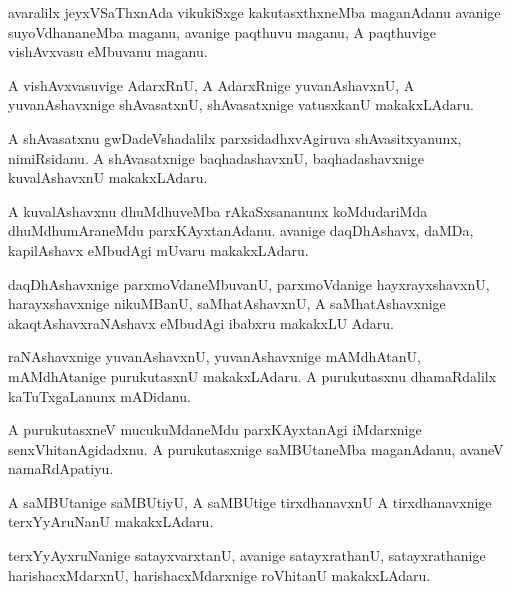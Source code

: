 \documentclass{article}
\begin{document}
\begin{mn}
avaralilx jeyxVSaThxnAda vikukiSxge kakutasxthxneMba maganAdanu
avanige suyoVdhananeMba maganu, avanige paqthuvu maganu, A paqthuvige
vishAvxvasu eMbuvanu maganu.
\end{mn}

\begin{mn}
A vishAvxvasuvige AdarxRnU, A AdarxRnige yuvanAshavxnU, A
yuvanAshavxnige shAvasatxnU, shAvasatxnige vatusxkanU makakxLAdaru.
\end{mn}

\begin{mn}%
A shAvasatxnu gwDadeVshadalilx parxsidadhxvAgiruva shAvasitxyanunx,
nimiRsidanu. A shAvasatxnige baqhadashavxnU, baqhadashavxnige
kuvalAshavxnU makakxLAdaru.
\end{mn}

\begin{mn}
A kuvalAshavxnu dhuMdhuveMba rAkaSxsananunx koMdudariMda
dhuMdhumAraneMdu parxKAyxtanAdanu. avanige daqDhAshavx, daMDa,
kapilAshavx eMbudAgi mUvaru makakxLAdaru.
\end{mn}

\begin{mn}%
daqDhAshavxnige parxmoVdaneMbuvanU, parxmoVdanige hayxrayxshavxnU,
harayxshavxnige nikuMBanU, saMhatAshavxnU, A saMhatAshavxnige
akaqtAshavxraNAshavx eMbudAgi ibabxru makakxLU Adaru.
\end{mn}

\begin{mn}%
raNAshavxnige yuvanAshavxnU, yuvanAshavxnige mAMdhAtanU, mAMdhAtanige
purukutasxnU makakxLAdaru. A purukutasxnu dhamaRdalilx kaTuTxgaLanunx mADidanu.
\end{mn}

\begin{mn}%
A purukutasxneV mucukuMdaneMdu parxKAyxtanAgi iMdarxnige
senxVhitanAgidadxnu. A purukutasxnige saMBUtaneMba maganAdanu, avaneV namaRdApatiyu.
\end{mn}

\begin{mn}
A saMBUtanige saMBUtiyU, A saMBUtige tirxdhanavxnU A tirxdhanavxnige
terxYyAruNanU makakxLAdaru.
\end{mn}

\begin{mn}%
terxYyAyxruNanige satayxvarxtanU, avanige satayxrathanU,
satayxrathanige harishacxMdarxnU, harishacxMdarxnige roVhitanU makakxLAdaru.
\end{mn}
\end{document}
